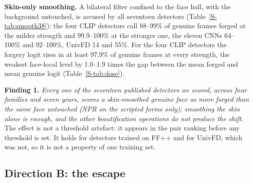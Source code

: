 \documentclass[conference]{IEEEtran}
\begin{document}
\textbf{Skin-only smoothing.} A bilateral filter confined to the face hull, with the background untouched, is accused by all
seventeen detectors (Table~\ref{S-tab:smooth38}): the four CLIP detectors call 88--99\% of genuine frames forged at the
milder strength and 99.9--100\% at the stronger one, the eleven CNNs 64--100\% and 92--100\%, UnivFD 14 and 55\%.
For the four CLIP detectors the forgery logit rises in at least 97.9\% of genuine frames at every strength, the weakest
face-local level by 1.0--1.9 times the gap between the mean forged and mean genuine logit (Table~\ref{S-tab:dose}).

\textbf{Finding 1.} \emph{Every one of the seventeen published detectors we scored, across four families and seven years, scores a skin-smoothed genuine face as more forged than the same face untouched (NPR on the scripted forms only); smoothing the skin alone is enough, and the other beautification operations do not produce the shift.} The effect is not a threshold artefact: it appears in the pair ranking before any
threshold is set. It holds for detectors trained on FF++ and for UnivFD, which was not, so it is not a property of one
training set. 

\subsection{Direction B: the escape}
\label{sec:escape}
\end{document}
